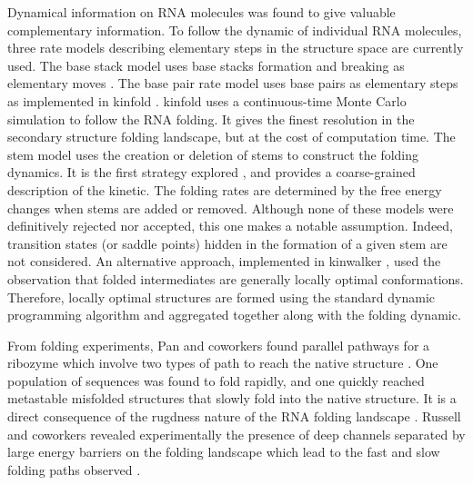 \documentclass[a4paper,12pt]{article}
\begin{document}
Dynamical information on RNA molecules was found to give valuable complementary
information. To follow the dynamic of individual RNA molecules, three rate
models describing elementary steps in the structure space are currently used.
The base stack model uses base stacks formation and breaking as elementary moves
. The base pair rate model uses base pairs as elementary steps as implemented in
kinfold \cite{flamm00_rna_foldin_at_elemen_step_resol}. kinfold uses a
continuous-time Monte Carlo simulation to follow the RNA folding. It gives the
finest resolution in the secondary structure folding landscape, but at the cost
of computation time. The stem model uses the creation or deletion of stems to
construct the folding dynamics. It is the first strategy explored
\cite{martinez84_rna_foldin_rule}, and provides a coarse-grained description of
the kinetic. The folding rates are determined by the free energy changes when
stems are added or removed. Although none of these models were definitively
rejected nor accepted, this one makes a notable assumption. Indeed, transition
states (or saddle points) hidden in the formation of a given stem are not
considered. An alternative approach, implemented in kinwalker
\cite{geis2008folding}, used the observation that folded intermediates are
generally locally optimal conformations. Therefore, locally optimal structures
are formed using the standard dynamic programming algorithm and aggregated
together along with the folding dynamic.

From folding experiments, Pan and coworkers found parallel pathways for a
ribozyme which involve two types of path to reach the native structure
\cite{pan97_foldin_rna_invol_paral_pathw}. One population of sequences was found
to fold rapidly, and one quickly reached metastable misfolded structures that
slowly fold into the native structure. It is a direct consequence of the
rugdness nature of the RNA folding landscape
\cite{solomatin10_multip_nativ_states_reveal_persis}. Russell and coworkers
revealed experimentally the presence of deep channels separated by large energy
barriers on the folding landscape which lead to the fast and slow folding paths
observed \cite{russell01_explor_foldin_lands_struc_rna}.
\end{document}
